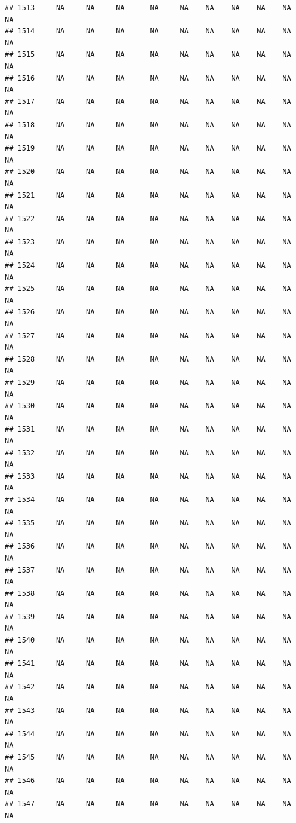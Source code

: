 \documentclass{article}\usepackage{graphicx, color}
\makeatletter
\newenvironment{kframe}{%
 \def\at@end@of@kframe{}%
 \ifinner\ifhmode%
  \def\at@end@of@kframe{\end{minipage}}%
  \begin{minipage}{\columnwidth}%
 \fi\fi%
 \def\FrameCommand##1{\hskip\@totalleftmargin \hskip-\fboxsep
 \colorbox{shadecolor}{##1}\hskip-\fboxsep
     \hskip-\linewidth \hskip-\@totalleftmargin \hskip\columnwidth}%
 \MakeFramed {\advance\hsize-\width
   \@totalleftmargin\z@ \linewidth\hsize
   \@setminipage}}%
 {\par\unskip\endMakeFramed%
 \at@end@of@kframe}
\newenvironment{knitrout}{}{} %
\makeatother
\begin{document}
\begin{knitrout}
\begin{kframe}
\begin{verbatim}
## 1513     NA     NA     NA      NA     NA    NA    NA    NA    NA     NA
## 1514     NA     NA     NA      NA     NA    NA    NA    NA    NA     NA
## 1515     NA     NA     NA      NA     NA    NA    NA    NA    NA     NA
## 1516     NA     NA     NA      NA     NA    NA    NA    NA    NA     NA
## 1517     NA     NA     NA      NA     NA    NA    NA    NA    NA     NA
## 1518     NA     NA     NA      NA     NA    NA    NA    NA    NA     NA
## 1519     NA     NA     NA      NA     NA    NA    NA    NA    NA     NA
## 1520     NA     NA     NA      NA     NA    NA    NA    NA    NA     NA
## 1521     NA     NA     NA      NA     NA    NA    NA    NA    NA     NA
## 1522     NA     NA     NA      NA     NA    NA    NA    NA    NA     NA
## 1523     NA     NA     NA      NA     NA    NA    NA    NA    NA     NA
## 1524     NA     NA     NA      NA     NA    NA    NA    NA    NA     NA
## 1525     NA     NA     NA      NA     NA    NA    NA    NA    NA     NA
## 1526     NA     NA     NA      NA     NA    NA    NA    NA    NA     NA
## 1527     NA     NA     NA      NA     NA    NA    NA    NA    NA     NA
## 1528     NA     NA     NA      NA     NA    NA    NA    NA    NA     NA
## 1529     NA     NA     NA      NA     NA    NA    NA    NA    NA     NA
## 1530     NA     NA     NA      NA     NA    NA    NA    NA    NA     NA
## 1531     NA     NA     NA      NA     NA    NA    NA    NA    NA     NA
## 1532     NA     NA     NA      NA     NA    NA    NA    NA    NA     NA
## 1533     NA     NA     NA      NA     NA    NA    NA    NA    NA     NA
## 1534     NA     NA     NA      NA     NA    NA    NA    NA    NA     NA
## 1535     NA     NA     NA      NA     NA    NA    NA    NA    NA     NA
## 1536     NA     NA     NA      NA     NA    NA    NA    NA    NA     NA
## 1537     NA     NA     NA      NA     NA    NA    NA    NA    NA     NA
## 1538     NA     NA     NA      NA     NA    NA    NA    NA    NA     NA
## 1539     NA     NA     NA      NA     NA    NA    NA    NA    NA     NA
## 1540     NA     NA     NA      NA     NA    NA    NA    NA    NA     NA
## 1541     NA     NA     NA      NA     NA    NA    NA    NA    NA     NA
## 1542     NA     NA     NA      NA     NA    NA    NA    NA    NA     NA
## 1543     NA     NA     NA      NA     NA    NA    NA    NA    NA     NA
## 1544     NA     NA     NA      NA     NA    NA    NA    NA    NA     NA
## 1545     NA     NA     NA      NA     NA    NA    NA    NA    NA     NA
## 1546     NA     NA     NA      NA     NA    NA    NA    NA    NA     NA
## 1547     NA     NA     NA      NA     NA    NA    NA    NA    NA     NA

\end{verbatim}
\end{kframe}
\end{knitrout}
\end{document}
